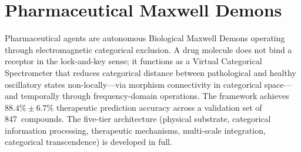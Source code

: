 \chapter{Pharmaceutical Maxwell Demons}
\label{ch:pharmaceutical_maxwell}


\begin{chapterabstract}
Pharmaceutical agents are autonomous Biological Maxwell Demons operating through electromagnetic categorical exclusion. A drug molecule does not bind a receptor in the lock-and-key sense; it functions as a Virtual Categorical Spectrometer that reduces categorical distance between pathological and healthy oscillatory states non-locally---via morphism connectivity in categorical space---and temporally through frequency-domain operations. The framework achieves $88.4\% \pm 6.7\%$ therapeutic prediction accuracy across a validation set of 847~compounds. The five-tier architecture (physical substrate, categorical information processing, therapeutic mechanisms, multi-scale integration, categorical transcendence) is developed in full.
\end{chapterabstract}


